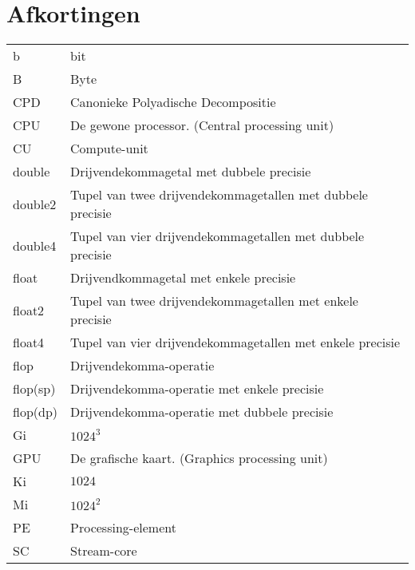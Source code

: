 \documentclass[master=cws ,masteroption=gs]{kulemt}
\begin{document}
\section*{Afkortingen}
\begin{flushleft}
	\renewcommand{\arraystretch}{1.1}
  	\begin{tabularx}{\textwidth}{@{}p{12mm}X@{}}
		b				& bit\\
		B				& Byte\\
    	CPD				& Canonieke Polyadische Decompositie\\
    	CPU				& De gewone processor. (Central processing unit)\\
    	CU				& Compute-unit\\
    	double			& Drijvendekommagetal met dubbele precisie\\
    	double2			& Tupel van twee drijvendekommagetallen met dubbele precisie\\
    	double4			& Tupel van vier drijvendekommagetallen met dubbele precisie\\
    	float			& Drijvendkommagetal met enkele precisie\\
    	float2			& Tupel van twee drijvendekommagetallen met enkele precisie\\
    	float4			& Tupel van vier drijvendekommagetallen met enkele precisie\\
    	flop			& Drijvendekomma-operatie\\
    	flop(sp)		& Drijvendekomma-operatie met enkele precisie\\
    	flop(dp)		& Drijvendekomma-operatie met dubbele precisie\\
    	Gi				& $1024^3$\\
    	GPU				& De grafische kaart. (Graphics processing unit)\\
    	Ki				& $1024$\\
    	Mi				& $1024^2$\\
    	PE				& Processing-element\\
    	SC				& Stream-core\\
  	\end{tabularx}
\end{flushleft}
\newpage
\end{document}
